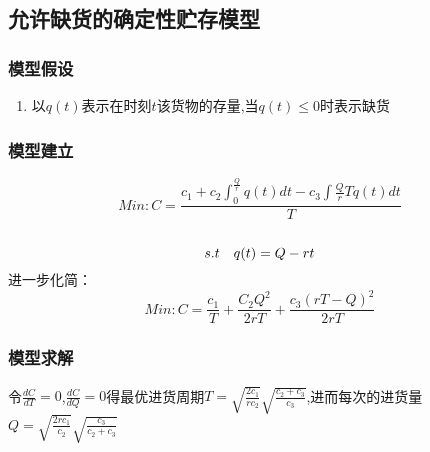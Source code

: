 \documentclass[12pt,a4paper]{article}
\begin{document}
\subsection{允许缺货的确定性贮存模型}
\subsubsection{模型假设}
\begin{enumerate}
，单位时间（每天）对物品的需求量恒为$r$吨；即经营商品单一，顾客对该物品需求量在时间上保持恒定；
$T$天进货$Q$吨；且假设每次进货是在存货全部售出后即刻进行，允许缺货，即$Q\le rT$;
$c_1$，在正常期间，还需支付货物的贮存费用，单位时间（天）单位（吨）货物需支付货物的贮存费用$c_2$;每天单位时间（天）单位（吨）货物需支付缺货费$c_3$；
\item 以$q(t)$表示在时刻$t$该货物的存量,当$q(t)\le 0$时表示缺货
\end{enumerate}
\subsubsection{模型建立}
 $$Min:C=\frac{c_1+c_2\int_{0}^{\frac{Q}{r}}q(t)dt-c_3\int{\frac{Q}{r}}{T}q(t)dt}{T}$$\\
\begin{displaymath}
 s.t \quad q(t)=Q-rt\\
\end{displaymath}
进一步化简：\\
$$Min: C=\frac{c_1}{T}+\frac{C_2 Q^2}{2rT}+\frac{c_3{(rT-Q)}^2}{2rT}$$
\subsubsection{模型求解}
令$\frac{dC}{dT}=0$,$\frac{dC}{dQ}=0$得最优进货周期$T=\sqrt{\frac{2c_1}{rc_2}}\sqrt{\frac{c_2+c_3}{c_3}}$,进而每次的进货量
$Q=\sqrt{\frac{2rc_1}{c_2}}\sqrt{\frac{c_3}{c_2+c_3}}$\\
\end{document}
